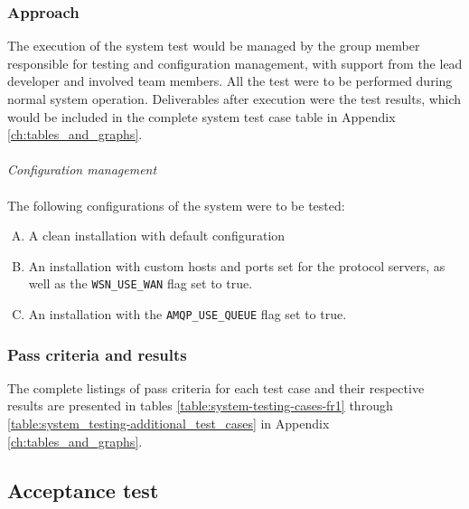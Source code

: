 \subsubsection{Approach}

The execution of the system test would be managed by the group member responsible for testing and configuration management, with support from the lead developer and involved team members. All the test were to be performed during normal system operation. Deliverables after execution were the test results, which would be included in the complete system test case table in Appendix \ref{ch:tables_and_graphs}. \\
\\
\textit{Configuration management}
\\
\\
The following configurations of the system were to be tested:
\begin{enumerate}[A.]
\item A clean installation with default configuration
\item An installation with custom hosts and ports set for the protocol servers, as well as the \verb!WSN_USE_WAN! flag set to true.
\item An installation with the \verb!AMQP_USE_QUEUE! flag set to true.
\end{enumerate}

\subsubsection{Pass criteria and results}

The complete listings of pass criteria for each test case and their respective results are presented in tables \ref{table:system-testing-cases-fr1} through \ref{table:system_testing-additional_test_cases} in Appendix \ref{ch:tables_and_graphs}.

\subsection{Acceptance test}
\label{subsec:testing-test_execution-acceptance_test}

